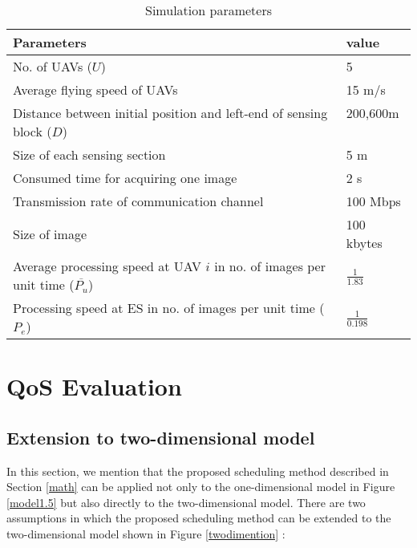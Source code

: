 \documentclass{ieeeaccess}
\begin{document}
\begin{table}
  \begin{center}
    \caption{Simulation parameters}
    \label{para_val}
    \begin{tabular}{ll}
     \hline
Parameters & value \\ \hline
No. of UAVs ($U$) & 5\\
Average flying speed of UAVs & 15 m/s \\
\shortstack[l]{Distance between initial position \\and left-end of sensing block ($D$)} & \shortstack[l]{200,600m\\~}  \\ 
Size of each sensing section & 5 m  \\ 
Consumed time for acquiring one image & 2 s \\ 
Transmission rate of communication channel & 100 Mbps \\ 
Size of image  &  100 kbytes \\ 
\shortstack[l]{Average processing speed at UAV $i$ \\in no. of images per unit time ($\overline{P_u}$)} & \shortstack[l]{$\frac{1}{1.83}$\\~} \\ 
\shortstack[l]{Processing speed at ES in no. of images \\per unit time ($P_e$)} & \shortstack[l]{$\frac{1}{0.198}$\\~} \\ \hline
    \end{tabular}
  \end{center}
\end{table}

\section{QoS Evaluation}
\subsection{Extension to two-dimensional model}\label{twodi}
In this section, we mention that the proposed scheduling method described in Section \ref{math} can be applied not only to the one-dimensional model in Figure \ref{model1.5} but also directly to the two-dimensional model.
There are two assumptions in which the proposed scheduling method can be extended to the two-dimensional model shown in Figure \ref{twodimention} :
\end{document}
